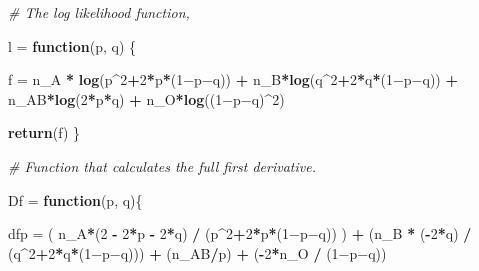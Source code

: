 \documentclass[]{article}
\newenvironment{Shaded}{\begin{snugshade}}{\end{snugshade}}
\newcommand{\KeywordTok}[1]{\textcolor[rgb]{0.13,0.29,0.53}{\textbf{#1}}}
\newcommand{\DecValTok}[1]{\textcolor[rgb]{0.00,0.00,0.81}{#1}}
\newcommand{\StringTok}[1]{\textcolor[rgb]{0.31,0.60,0.02}{#1}}
\newcommand{\CommentTok}[1]{\textcolor[rgb]{0.56,0.35,0.01}{\textit{#1}}}
\newcommand{\ControlFlowTok}[1]{\textcolor[rgb]{0.13,0.29,0.53}{\textbf{#1}}}
\newcommand{\OperatorTok}[1]{\textcolor[rgb]{0.81,0.36,0.00}{\textbf{#1}}}
\newcommand{\NormalTok}[1]{#1}
\begin{document}
\begin{Shaded}
\begin{Highlighting}[]
\CommentTok{# The log likelihood function,}

\NormalTok{l =}\StringTok{ }\ControlFlowTok{function}\NormalTok{(p, q) \{}

\NormalTok{  f =}\StringTok{ }\NormalTok{n_A }\OperatorTok{*}\StringTok{ }\KeywordTok{log}\NormalTok{(p}\OperatorTok{^}\DecValTok{2}\OperatorTok{+}\DecValTok{2}\OperatorTok{*}\NormalTok{p}\OperatorTok{*}\NormalTok{(}\DecValTok{1}\NormalTok{−p−q)) }\OperatorTok{+}\StringTok{ }\NormalTok{n_B}\OperatorTok{*}\KeywordTok{log}\NormalTok{(q}\OperatorTok{^}\DecValTok{2}\OperatorTok{+}\DecValTok{2}\OperatorTok{*}\NormalTok{q}\OperatorTok{*}\NormalTok{(}\DecValTok{1}\NormalTok{−p−q)) }\OperatorTok{+}\StringTok{ }\NormalTok{n_AB}\OperatorTok{*}\KeywordTok{log}\NormalTok{(}\DecValTok{2}\OperatorTok{*}\NormalTok{p}\OperatorTok{*}\NormalTok{q) }\OperatorTok{+}\StringTok{ }\NormalTok{n_O}\OperatorTok{*}\KeywordTok{log}\NormalTok{((}\DecValTok{1}\NormalTok{−p−q)}\OperatorTok{^}\DecValTok{2}\NormalTok{)}

  \KeywordTok{return}\NormalTok{(f)}
\NormalTok{\}}



\CommentTok{# Function that calculates the full first derivative. }

\NormalTok{Df =}\StringTok{ }\ControlFlowTok{function}\NormalTok{(p, q)\{}
  
\NormalTok{  dfp =}\StringTok{   }\NormalTok{( n_A}\OperatorTok{*}\NormalTok{(}\DecValTok{2} \OperatorTok{-}\StringTok{ }\DecValTok{2}\OperatorTok{*}\NormalTok{p }\OperatorTok{-}\StringTok{ }\DecValTok{2}\OperatorTok{*}\NormalTok{q) }\OperatorTok{/}\StringTok{ }\NormalTok{(p}\OperatorTok{^}\DecValTok{2}\OperatorTok{+}\DecValTok{2}\OperatorTok{*}\NormalTok{p}\OperatorTok{*}\NormalTok{(}\DecValTok{1}\NormalTok{−p−q)) )   }
        \OperatorTok{+}\StringTok{ }\NormalTok{(n_B }\OperatorTok{*}\StringTok{ }\NormalTok{(}\OperatorTok{-}\DecValTok{2}\OperatorTok{*}\NormalTok{q) }\OperatorTok{/}\StringTok{ }\NormalTok{(q}\OperatorTok{^}\DecValTok{2}\OperatorTok{+}\DecValTok{2}\OperatorTok{*}\NormalTok{q}\OperatorTok{*}\NormalTok{(}\DecValTok{1}\NormalTok{−p−q))) }
        \OperatorTok{+}\StringTok{ }\NormalTok{(n_AB}\OperatorTok{/}\NormalTok{p) }
        \OperatorTok{+}\StringTok{ }\NormalTok{(}\OperatorTok{-}\DecValTok{2}\OperatorTok{*}\NormalTok{n_O }\OperatorTok{/}\StringTok{ }\NormalTok{(}\DecValTok{1}\NormalTok{−p−q))}
  

\end{Highlighting}
\end{Shaded}
\end{document}
